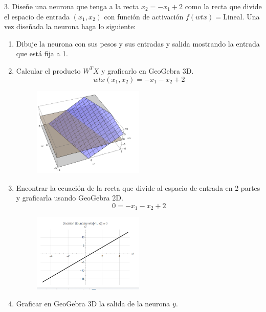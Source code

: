 \documentclass{article}
\begin{document}
\begin{flushleft}
  3. Diseñe una neurona que tenga a la recta $x_2=-x_1+2$ como la recta que divide el espacio de entrada $(x_1,x_2)$ con 
  función de activación $f(wtx)=\text{Lineal}$. Una vez diseñada la neurona haga lo siguiente:
  \begin{enumerate}
    \item Dibuje la neurona con sus pesos y sus entradas y salida mostrando la entrada que está fija a 1.
    \item Calcular el producto $W^T X$ y graficarlo en GeoGebra 3D.
    \[ wtx(x_1, x_2) = - x_1 - x_2 + 2 \]
    \begin{figure}[H]
      \centering
      \includegraphics[width=0.5\textwidth]{Imagen0.png}  %
    \end{figure}
    \item Encontrar la ecuación de la recta que divide al espacio de entrada en 2 partes y graficarla usando GeoGebra 2D.
    \[ 0 = - x_1 - x_2 + 2 \]
    \begin{figure}[H]
      \centering
      \includegraphics[width=0.5\textwidth]{2_Decision_boundry.PNG}  %
    \end{figure}
    \item Graficar en GeoGebra 3D la salida de la neurona $y$.
    \begin{figure}[H]
      \centering

\end{figure}
\end{enumerate}
\end{flushleft}
\end{document}
